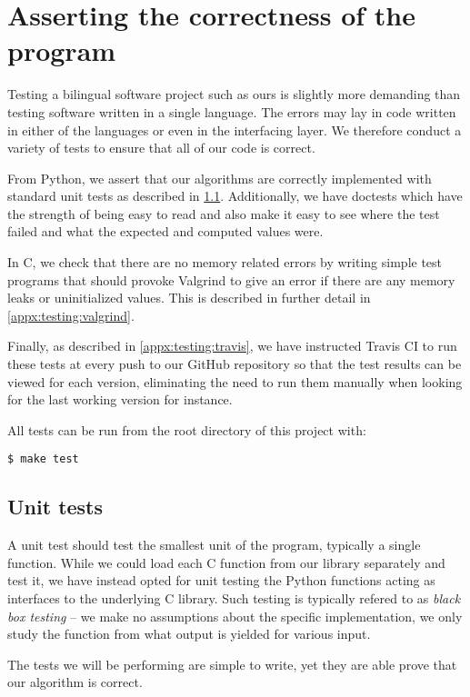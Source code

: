 \section{Asserting the correctness of the program}
\label{appx:testing}

Testing a bilingual software project such as ours is slightly more demanding than testing software written in a single language. The errors may lay in code written in either of the languages or even in the interfacing layer. We therefore conduct a variety of tests to ensure that all of our code is correct.

From Python, we assert that our algorithms are correctly implemented with standard unit tests as described in \ref{appx:testing:unit_tests}. Additionally, we have doctests which have the strength of being easy to read and also make it easy to see where the test failed and what the expected and computed values were.

In C, we check that there are no memory related errors by writing simple test programs that should provoke Valgrind to give an error if there are any memory leaks or uninitialized values. This is described in further detail in \ref{appx:testing:valgrind}.

Finally, as described in \ref{appx:testing:travis}, we have instructed Travis CI to run these tests at every push to our GitHub repository so that the test results can be viewed for each version, eliminating the need to run them manually when looking for the last working version for instance.

All tests can be run from the root directory of this project with:
\begin{verbatim}
$ make test
\end{verbatim}

\subsection{Unit tests}
\label{appx:testing:unit_tests}
A unit test should test the smallest unit of the program, typically a single function. While we could load each C function from our library separately and test it, we have instead opted for unit testing the Python functions acting as interfaces to the underlying C library. Such testing is typically refered to as \emph{black box testing} -- we make no assumptions about the specific implementation, we only study the function from what output is yielded for various input.

The tests we will be performing are simple to write, yet they are able prove that our algorithm is correct.

